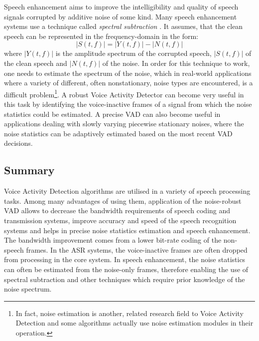 Speech enhancement aims to improve the intelligibility and quality of speech signals corrupted by additive noise of some kind. Many speech enhancement systems use a technique called \emph{spectral subtraction} \cite{Kondoz, RamirezGorriz}. It assumes, that the clean speech can be represented in the frequency-domain in the form:
\begin{equation}
|S(t,f)| = |Y(t,f)| - |N(t,f)|
\end{equation}
where $|Y(t,f)|$ is the amplitude spectrum of the corrupted speech, $|S(t,f)|$ of the clean speech and $|N(t,f)|$ of the noise. In order for this technique to work, one needs to estimate the spectrum of the noise, which in real-world applications where a variety of different, often nonstationary, noise types are encountered, is a difficult problem\footnote{In fact, noise estimation is another, related research field to Voice Activity Detection and some algorithms actually use noise estimation modules in their operation.}. A robust Voice Activity Detector can become very useful in this task by identifying the voice-inactive frames of a signal from which the noise statistics could be estimated. A precise VAD can also become useful in applications dealing with slowly varying piecewise stationary noises, where the noise statistics can be adaptively estimated based on the most recent VAD decisions.

\subsection{Summary}

Voice Activity Detection algorithms are utilised in a variety of speech processing tasks. Among many advantages of using them, application of the noise-robust VAD allows to decrease the bandwidth requirements of speech coding and transmission systems, improve accuracy and speed of the speech recognition systems and helps in precise noise statistics estimation and speech enhancement. The bandwidth improvement comes from a lower bit-rate coding of the non-speech frames. In the ASR systems, the voice-inactive frames are often dropped from processing in the core system. In speech enhancement, the noise statistics can often be estimated from the noise-only frames, therefore enabling the use of spectral subtraction and other techniques which require prior knowledge of the noise spectrum.


